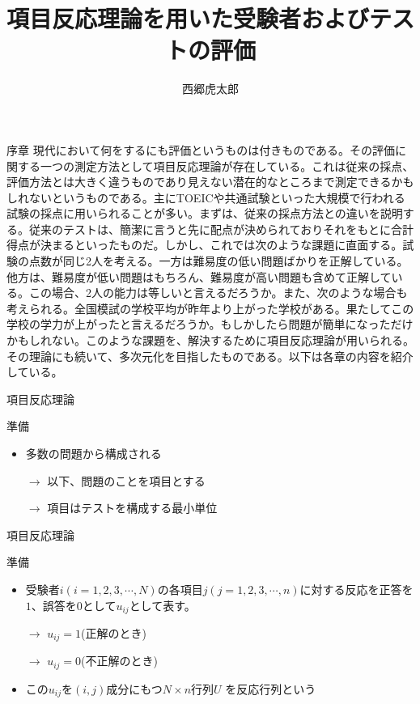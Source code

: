 \documentclass[dvipdfmx,fleqn]{beamer}
\title{項目反応理論を用いた受験者およびテストの評価}
\author{西郷虎太郎}
\institute{熊本大学大学院自然科学教育部博士前期課程\\機械数理工学専攻数理工学教育プログラム}
\date{}
\begin{document}
\begin{frame}
	\titlepage
\end{frame}

\begin{frame}{序章}
		現代において何をするにも評価というものは付きものである。その評価に関する一つの測定方法として項目反応理論が存在している。これは従来の採点、評価方法とは大きく違うものであり見えない潜在的なところまで測定できるかもしれないというものである。主にTOEICや共通試験といった大規模で行われる試験の採点に用いられることが多い。まずは、従来の採点方法との違いを説明する。従来のテストは、簡潔に言うと先に配点が決められておりそれをもとに合計得点が決まるといったものだ。しかし、これでは次のような課題に直面する。試験の点数が同じ2人を考える。一方は難易度の低い問題ばかりを正解している。他方は、難易度が低い問題はもちろん、難易度が高い問題も含めて正解している。この場合、2人の能力は等しいと言えるだろうか。また、次のような場合も考えられる。全国模試の学校平均が昨年より上がった学校がある。果たしてこの学校の学力が上がったと言えるだろうか。もしかしたら問題が簡単になっただけかもしれない。このような課題を、解決するために項目反応理論が用いられる。その理論にも続いて、多次元化を目指したものである。以下は各章の内容を紹介している。
\end{frame}

\begin{frame}{項目反応理論}
	\begin{dblock}{準備}
    \begin{itemize}
      \item 多数の問題から構成される
      \item[$\rightarrow$]以下、問題のことを項目とする
      \item[$\rightarrow$]項目はテストを構成する最小単位
    \end{itemize}
	\end{dblock}
\end{frame}

\begin{frame}{項目反応理論}
	\begin{dblock}{準備}
    \begin{itemize}
      \item 受験者$i(i = 1, 2, 3, \cdots, N)$の各項目$j(j = 1, 2, 3, \cdots, n)$に対する反応を正答を$1$、誤答を$0$として$u_{ij}$として表す。
      \item[$\rightarrow$] $u_{ij} = 1$(正解のとき)
      \item[$\rightarrow$] $u_{ij} = 0$(不正解のとき)
      \item この$u_{ij}$を$(i,j)$成分にもつ$N\times n$行列$U$ を反応行列という
    \end{itemize}
	\end{dblock}
\end{frame}
\end{document}
